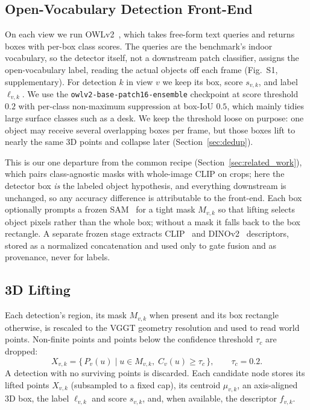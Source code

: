 \subsection{Open-Vocabulary Detection Front-End}
\label{sec:owlv2}

On each view we run OWLv2~\cite{minderer2023owlv2}, which takes free-form text queries and returns boxes
with per-box class scores. The queries are the benchmark's indoor vocabulary, so the detector itself, not
a downstream patch classifier, assigns the open-vocabulary label, reading the actual objects off each
frame (Fig.~S1, supplementary). For detection $k$ in view $v$ we keep its box, score $s_{v,k}$, and label
$\ell_{v,k}$. We use the \texttt{owlv2-base-patch16-ensemble} checkpoint at score threshold $0.2$ with
per-class non-maximum suppression at box-IoU $0.5$, which mainly tidies large surface classes such as a
desk. We keep the threshold loose on purpose: one object may receive several overlapping boxes per frame,
but those boxes lift to nearly the same 3D points and collapse later (Section~\ref{sec:dedup}).

This is our one departure from the common recipe (Section~\ref{sec:related_work}), which pairs
class-agnostic masks with whole-image CLIP on crops; here the detector box \emph{is} the labeled object
hypothesis, and everything downstream is unchanged, so any accuracy difference is attributable to the
front-end. Each box optionally prompts a frozen SAM~\cite{kirillov2023segment} for a tight mask
$M_{v,k}$ so that lifting selects object pixels rather than the whole box; without a mask it falls back to
the box rectangle. A separate frozen stage extracts CLIP~\cite{radford2021clip} and
DINOv2~\cite{oquab2023dinov2} descriptors, stored as a normalized concatenation and used only to gate
fusion and as provenance, never for labels.

\subsection{3D Lifting}
\label{sec:lifting}

Each detection's region, its mask $M_{v,k}$ when present and its box rectangle otherwise, is rescaled to
the VGGT geometry resolution and used to read world points. Non-finite points and points below the
confidence threshold $\tau_c$ are dropped:
\begin{equation}
    X_{v,k} = \{\,P_v(u) \mid u \in M_{v,k},\; C_v(u) \geq \tau_c\,\}, \qquad \tau_c = 0.2 .
\end{equation}
A detection with no surviving points is discarded. Each candidate node stores its lifted points $X_{v,k}$
(subsampled to a fixed cap), its centroid $\mu_{v,k}$, an axis-aligned 3D box, the label $\ell_{v,k}$ and
score $s_{v,k}$, and, when available, the descriptor $f_{v,k}$.

